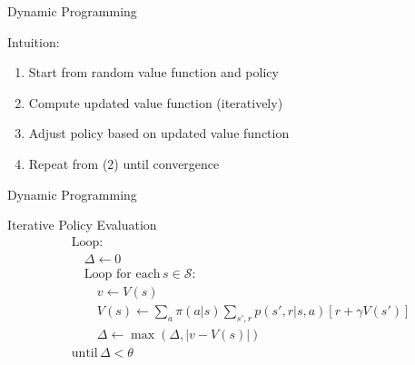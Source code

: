 \documentclass[ignorenonframetext,xcolor=x11names]{beamer}
\begin{document}
\begin{frame}[label=full]{Dynamic Programming}
\begin{block}{Intuition:}
  \begin{enumerate}
     \item Start from random value function and policy
     \item Compute updated value function (iteratively)
     \item Adjust policy based on updated value function
     \item Repeat from (2) until convergence
  \end{enumerate}
\end{block}
\end{frame}

\begin{frame}[label=full]{Dynamic Programming}
\begin{block}{Iterative Policy Evaluation}
\begin{align*}
&\text{Loop:} \\
&\quad \Delta \leftarrow 0 \\
&\quad \text{Loop for each}\, s \in \mathcal{S}: \\
&\quad \quad v \leftarrow V(s) \\
&\quad \quad V(s) \leftarrow \sum\nolimits_a \pi(a|s) \sum\nolimits_{s', r} p(s', r|s, a)[r + \gamma V(s')] \\
&\quad \quad \Delta \leftarrow \max (\Delta, |v - V(s)|) \\
&\text{until}\, \Delta < \theta
\end{align*}
\end{block}
\end{frame}
\end{document}
